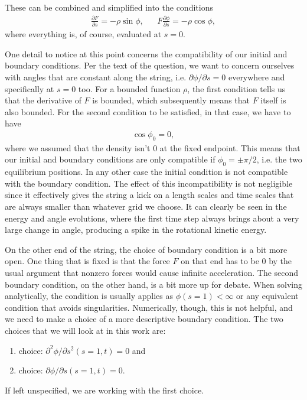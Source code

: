 \documentclass[10pt,a4paper,twocolumn]{article}
\begin{document}
These can be combined and simplified into the conditions
%
\begin{align}
    &\frac{\partial F}{\partial s} = - \rho \sin \phi,& &F \frac{\partial \phi}{\partial s} = - \rho \cos \phi,&
\end{align}
%
where everything is, of course, evaluated at $s=0$.

One detail to notice at this point concerns the compatibility of our initial and boundary conditions. Per the text of the question, we want to concern ourselves with angles that are constant along the string, i.e. $\partial \phi / \partial s = 0$ everywhere and specifically at $s=0$ too. For a bounded function $\rho$, the first condition tells us that the derivative of $F$ is bounded, which subsequently means that $F$ itself is also bounded. For the second condition to be satisfied, in that case, we have to have
%
\begin{align}
    \cos \phi_0 = 0,
\end{align}
%
where we assumed that the density isn't $0$ at the fixed endpoint. This means that our initial and boundary conditions are only compatible if $\phi_0 = \pm \pi/2$, i.e. the two equilibrium positions. In any other case the initial condition is not compatible with the boundary condition. The effect of this incompatibility is not negligible since it effectively gives the string a kick on a length scales and time scales that are always smaller than whatever grid we choose. It can clearly be seen in the energy and angle evolutions, where the first time step always brings about a very large change in angle, producing a spike in the rotational kinetic energy.

On the other end of the string, the choice of boundary condition is a bit more open. One thing that is fixed is that the force $F$ on that end has to be $0$ by the usual argument that nonzero forces would cause infinite acceleration. The second boundary condition, on the other hand, is a bit more up for debate. When solving analytically, the condition is usually applies as $\phi(s=1) < \infty$ or any equivalent condition that avoids singularities. Numerically, though, this is not helpful, and we need to make a choice of a more descriptive boundary condition. The two choices that we will look at in this work are:
%
\begin{enumerate}
    \item choice: $\partial^2 \phi / \partial s^2 (s=1,t) = 0$ and
    \item choice: $\partial \phi / \partial s (s=1,t) = 0$.
\end{enumerate}
%
If left unspecified, we are working with the first choice.
\end{document}
